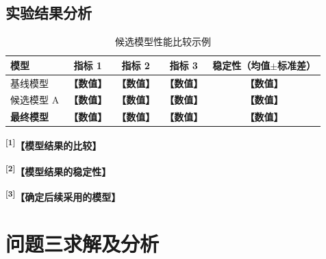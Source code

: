 \documentclass[UTF8,a4paper,12pt,fontset=fandol]{ctexart}
\newif\ifDraftAid
\newcommand{\ph}[1]{\textbf{\color{phg}【#1】}}
\newcommand{\detail}[1]{%
  \ifDraftAid\textnormal{\color{detailg}\small\,（参考写法：#1）}\fi}
\newcommand{\PHD}[2]{\ph{#1}\detail{#2}}
\newcommand{\SN}[1]{\textsuperscript{\color{noteg}\bfseries[#1]}}
\newcommand{\Note}[2]{\par\noindent\textbf{[#1]}\ #2}
\newcommand{\Annotated}[2]{%
\ifDraftAid
\noindent\begin{minipage}[t]{0.735\linewidth}\vspace{0pt}#1\end{minipage}\hfill
\begin{minipage}[t]{0.235\linewidth}\vspace{0pt}\footnotesize\color{noteg}\raggedright
\begin{tcolorbox}[colback=notebg,colframe=ruleg,boxrule=0.35pt,arc=1mm,left=1.2mm,right=1.2mm,top=1mm,bottom=1mm]
#2
\end{tcolorbox}\end{minipage}
\else
#1
\fi
}
\numberwithin{figure}{section}
\numberwithin{table}{section}
\begin{document}
\subsection{实验结果分析}
\begin{table}[H]
\centering\caption{候选模型性能比较示例}\renewcommand{\arraystretch}{1.25}
\begin{tabular}{lcccc}
\toprule 模型 & 指标 1 & 指标 2 & 指标 3 & 稳定性（均值$\pm$标准差）\\ \midrule
基线模型 & \ph{数值} & \ph{数值} & \ph{数值} & \ph{数值}\\
候选模型 A & \ph{数值} & \ph{数值} & \ph{数值} & \ph{数值}\\
\textbf{最终模型} & \textbf{\ph{数值}} & \textbf{\ph{数值}} & \textbf{\ph{数值}} & \textbf{\ph{数值}}\\ \bottomrule
\end{tabular}
\end{table}

\Annotated{
\SN{1}\PHD{模型结果的比较}{由表〔编号〕可知，所选模型在各个评价指标上都达到了较好的预期效果：〔最终模型〕在〔主要指标〕上取得〔数值A〕，高于〔比较模型〕的〔数值B〕；在〔其他指标〕上也保持较好结果。可见问题一选出的〔特征或数据〕具有很好的代表性，与〔目标现象〕密切相关，进一步说明了所选特征的正确性和有效性。}

\par\medskip
\SN{2}\PHD{模型结果的稳定性}{如图〔编号〕所示，〔模型A〕在〔类别X〕和〔类别Y〕上出现了错误分类，而〔最终模型〕仅在一小部分〔类别〕上出现错误分类，总体来说〔最终模型〕表现最好，说明这些特征在〔任务〕中具有重要的区分能力。在〔交叉验证或多次重复实验〕中，〔最终模型〕的〔主要指标〕平均值为〔数值〕，标准差为〔数值〕，各次实验结果波动较小，说明模型性能并非由单次数据划分造成。}

\par\medskip
\SN{3}\PHD{确定后续采用的模型}{综合各项评价结果，本文选择〔模型名称〕作为后续问题的基础模型。问题三仍采用问题一得到的〔特征或数据处理结果〕，并在该模型基础上针对〔问题三的新要求〕作进一步研究。}
}{
\Note{1}{不要写“从表可知模型效果很好”，要写比较对象和幅度。}
\Note{2}{均值与标准差比单次最高值更有说服力。}
\Note{3}{问题三在问题二模型基础上调整时，写清主要改动即可。}
}

\section{问题三求解及分析}
\end{document}
